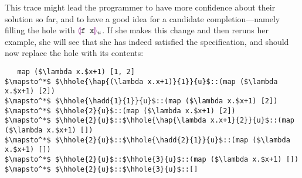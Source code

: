 This trace might lead the programmer to have more confidence about their
solution so far, and to have a good idea for a candidate
completion---namely filling the hole with $\textcolor{violet}{\llparenthesis}\texttt{f x}\textcolor{violet}{\rrparenthesis}_{u}$. If she
makes this change and then reruns her example, she will see that she has
indeed satisfied the specification, and should now replace the hole with
its contents:
\begin{lstlisting}
   map ($\lambda x.$x+1) [1, 2]
$\mapsto^*$ $\hhole{\hap{(\lambda x.x+1)}{1}}{u}$::(map ($\lambda x.$x+1) [2])
$\mapsto^*$ $\hhole{\hadd{1}{1}}{u}$::(map ($\lambda x.$x+1) [2])
$\mapsto^*$ $\hhole{2}{u}$::(map ($\lambda x.$x+1) [2])
$\mapsto^*$ $\hhole{2}{u}$::$\hhole{\hap{\lambda x.x+1}{2}}{u}$::(map ($\lambda x.$x+1) [])
$\mapsto^*$ $\hhole{2}{u}$::$\hhole{\hadd{2}{1}}{u}$::(map ($\lambda x.$x+1) [])
$\mapsto^*$ $\hhole{2}{u}$::$\hhole{3}{u}$::(map ($\lambda x.$x+1) [])
$\mapsto^*$ $\hhole{2}{u}$::$\hhole{3}{u}$::[]
\end{lstlisting}
